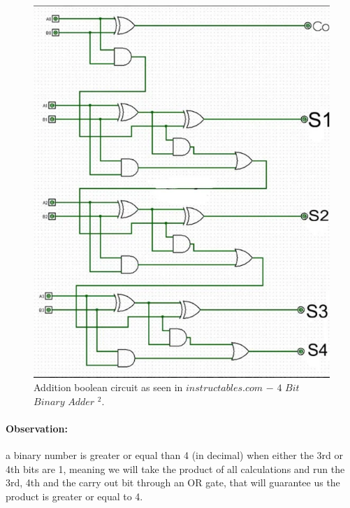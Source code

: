\documentclass{article}
\begin{document}
\begin{figure}[H]
    \centering
    \includegraphics[width=1\linewidth]{FMUD6P1LJ1FVETK.png}
    \caption{Addition boolean circuit as seen in $instructables.com$ $-$ $4$ $Bit$ $Binary$ $Adder$ $^2$.}
    \label{fig:enter-label}
\end{figure}
\newpage
\paragraph {Observation:} a binary number is greater or equal than 4 (in decimal) when either the 3rd or 4th bits are 1, meaning we will take the product of all calculations and run the 3rd, 4th and the carry out bit through an OR gate, that will guarantee us the product is greater or equal to 4.
\end{document}
